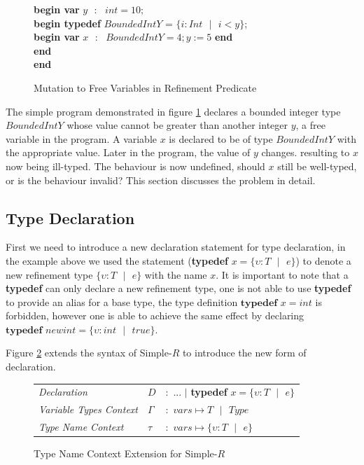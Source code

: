 \documentclass[a4paper,12pt]{report}
\newenvironment{tabs}[1]
 {\flushleft\TabPositions{#1}}
 {\endflushleft}
\begin{document}
\begin{figure} [H]
  \begin{tabs}{1cm,2cm}
    \textbf{begin var }$y\text{ }:\text{ } int = 10;$ \\
    \tab\textbf{begin typedef }$BoundedIntY$ = $\{i : Int\text{ }|\text{ } i < y\}$; \\ 
    \tab\tab\textbf{begin var }$x\text{ }:\text{ }BoundedIntY = 4;y := 5$\textbf { end} \\
    \tab\textbf {end} \\
    \textbf{end}
  \end{tabs}  
  \caption{Mutation to Free Variables in Refinement Predicate}
  \label{fig:amb_refinement_vars}
\end{figure}

\par
The simple program demonstrated in figure \ref{fig:amb_refinement_vars} declares a 
bounded integer type $BoundedIntY$ whose value cannot be greater than another integer $y$, 
a free variable in the program. A variable $x$ is declared to be of type 
$BoundedIntY$ with the appropriate value. Later in the program, the value of $y$ 
changes. resulting to $x$ now being ill-typed. The behaviour is now undefined, 
should $x$ still be well-typed, or is the behaviour invalid? This section 
discusses the problem in detail. 

\subsection{Type Declaration}
First we need to introduce a new declaration statement for type declaration, 
in the example above we used the statement 
(\textbf{typedef} $x = \{\upsilon : T\text{ }|\text{ }e\}$) to denote a 
new refinement type $\{\upsilon : T\text{ }|\text{ }e\}$ with the name $x$. It is 
important to note that a \textbf{typedef} can only declare a new refinement type, one is 
not able to use \textbf{typedef} to provide an alias for a base type, the type 
definition $\textbf{typedef } x = int$ is forbidden, however one is able to achieve the 
same effect by declaring $\textbf{typedef }newint = \{\upsilon : int\text{ }|\text{ }true\}$.

\par
Figure \ref{fig:typedef-extend} extends the syntax of Simple-$R$ to introduce 
the new form of declaration.
\begin{figure}[H]
  \begin{center}
    \begin{tabular} {l l l}
      \textit{Declaration} & $D$ & $:$ ... $|$ \textbf{typedef }$x = \{\upsilon : T\text{ }|\text{ }e\}$\\
      \textit{Variable Types Context} & $\Gamma$& $:$ $vars \mapsto T\text{ }|\text{ }Type$\\
      \textit{Type Name Context} & $\tau$& $:$ $vars \mapsto \{\upsilon : T\text{ }|\text{ }e\}$ \\
    \end{tabular}
  \end{center}
  \caption{Type Name Context Extension for Simple-$R$}
  \label{fig:typedef-extend}
\end{figure}
\end{document}
